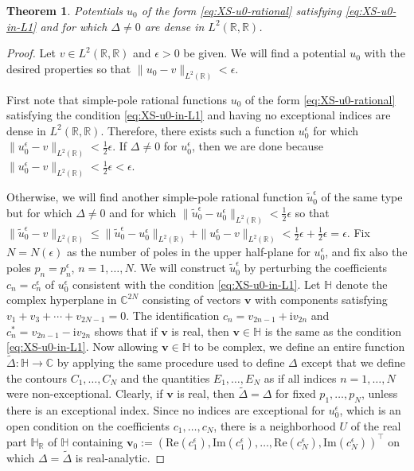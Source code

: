 \documentclass[10pt,a4paper]{amsart}
\newtheorem{theorem}{Theorem}
\newcommand{\ii}{\mathrm{i}}
\begin{document}
\begin{theorem}
    Potentials $u_0$ of the form \eqref{eq:XS-u0-rational} satisfying \eqref{eq:XS-u0-in-L1} and for which $\Delta\neq 0$ are dense in $L^2(\mathbb{R},\mathbb{R})$.
\end{theorem}

\begin{proof}
Let $v\in L^2(\mathbb{R},\mathbb{R})$ and $\epsilon>0$ be given.  We will find a potential $u_0$ with the desired properties so that $\|u_0-v\|_{L^2(\mathbb{R})}<\epsilon$.  

    First note that simple-pole rational functions $u_0$ of the form \eqref{eq:XS-u0-rational} satisfying the condition \eqref{eq:XS-u0-in-L1} and having no exceptional indices are dense in $L^2(\mathbb{R},\mathbb{R})$.  Therefore, there exists such a function $u_0^\epsilon$ for which $\|u^\epsilon_0-v\|_{L^2(\mathbb{R})}<\frac{1}{2}\epsilon$.  If $\Delta\neq 0$ for $u_0^\epsilon$, then we are done because $\|u_0^\epsilon-v\|_{L^2(\mathbb{R})}<\frac{1}{2}\epsilon<\epsilon$.
    
    Otherwise, we will find another simple-pole rational function $\widetilde{u}_0^\epsilon$ of the same type but for which $\Delta\neq 0$ and for which $\|\widetilde{u}_0^\epsilon-u_0^\epsilon\|_{L^2(\mathbb{R})}<\frac{1}{2}\epsilon$ so that $\|\widetilde{u}_0^\epsilon-v\|_{L^2(\mathbb{R})}\le \|\widetilde{u}_0^\epsilon-u_0^\epsilon\|_{L^2(\mathbb{R})}+\|u_0^\epsilon-v\|_{L^2(\mathbb{R})}<\frac{1}{2}\epsilon+\frac{1}{2}\epsilon=\epsilon$.  Fix $N=N(\epsilon)$ as the number of poles in the upper half-plane for $u_0^\epsilon$, and fix also the poles $p_n=p_n^\epsilon$, $n=1,\dots,N$.  We will construct $\widetilde{u}_0^\epsilon$ by perturbing the coefficients $c_n=c_n^\epsilon$ of $u_0^\epsilon$ consistent with the condition \eqref{eq:XS-u0-in-L1}.  Let $\mathbb{H}$ denote the complex hyperplane in $\mathbb{C}^{2N}$ consisting of vectors $\mathbf{v}$ with components satisfying $v_1+v_3+\cdots + v_{2N-1}=0$. The identification $c_n=v_{2n-1}+\ii v_{2n}$ and $c_n^*=v_{2n-1}-\ii v_{2n}$ shows that if $\mathbf{v}$ is real, then $\mathbf{v}\in\mathbb{H}$ is the same as the condition \eqref{eq:XS-u0-in-L1}.  Now allowing $\mathbf{v}\in\mathbb{H}$ to be complex,  we define an entire function $\widetilde{\Delta}:\mathbb{H}\to\mathbb{C}$ by applying the same procedure used to define $\Delta$ except that we define the contours $C_1,\dots,C_N$ and the quantities $E_1,\dots,E_N$ as if all indices $n=1,\dots,N$ were non-exceptional.  Clearly, if $\mathbf{v}$ is real, then $\widetilde{\Delta}=\Delta$ for fixed $p_1,\dots,p_N$, unless there is an exceptional index.  Since no indices are exceptional for $u_0^\epsilon$, which is an open condition on the coefficients $c_1,\dots,c_N$, there is a neighborhood $U$ of the real part $\mathbb{H}_\mathbb{R}$ of $\mathbb{H}$ containing $\mathbf{v}_0:=(\mathrm{Re}(c_1^\epsilon),\mathrm{Im}(c_1^\epsilon),\dots,\mathrm{Re}(c_N^\epsilon),\mathrm{Im}(c_N^\epsilon))^\top$ on which $\Delta=\widetilde{\Delta}$ is real-analytic.
    

\end{proof}
\end{document}

